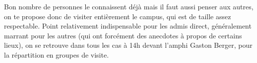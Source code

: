 Bon nombre de personnes le connaissent déjà mais il faut aussi penser aux
autres, on te propose donc de visiter entièrement le campus, qui est
de taille assez respectable. Point relativement indispensable pour les admis direct,
généralement marrant pour les autres (qui ont forcément des anecdotes à
propos de certains lieux), on se retrouve dans tous les cas à 14h
devant l'amphi Gaston Berger, pour la répartition en groupes de visite.

